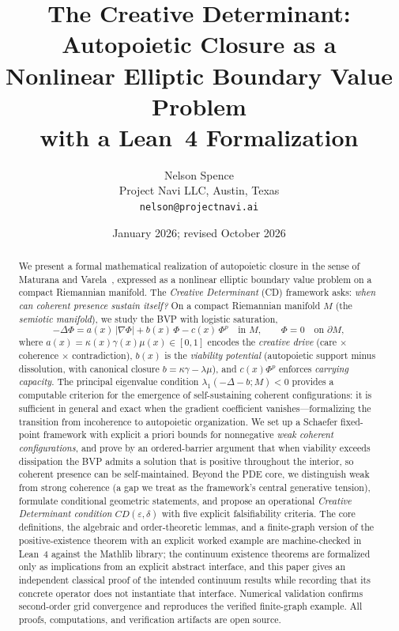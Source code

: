 \documentclass[11pt]{article}
\title{The Creative Determinant: Autopoietic Closure as a\\
Nonlinear Elliptic Boundary Value Problem\\
with a Lean~4 Formalization}
\author{Nelson Spence\\
Project Navi LLC, Austin, Texas\\
\texttt{nelson@projectnavi.ai}}
\date{January 2026; revised October 2026}
\theoremstyle{plain}
\theoremstyle{definition}
\theoremstyle{remark}
\newcommand{\abs}[1]{\left\lvert #1\right\rvert}
\begin{document}
\maketitle

\begin{abstract}
We present a formal mathematical realization of autopoietic closure in the sense of Maturana and Varela~\cite{MaturanaVarela1980}, expressed as a nonlinear elliptic boundary value problem on a compact Riemannian manifold.
The \emph{Creative Determinant} (CD) framework asks: \emph{when can coherent presence sustain itself?}
On a compact Riemannian manifold \(M\) (the \emph{semiotic manifold}), we study the BVP with logistic saturation,
\[
-\Delta \Phi = a(x)\,\abs{\nabla \Phi} + b(x)\,\Phi - c(x)\,\Phi^p\quad\text{in }M,\qquad \Phi=0\quad\text{on }\partial M,
\]
where \(a(x)=\kappa(x)\gamma(x)\mu(x)\in[0,1]\) encodes the \emph{creative drive} (care \(\times\) coherence \(\times\) contradiction), \(b(x)\) is the \emph{viability potential} (autopoietic support minus dissolution, with canonical closure \(b=\kappa\gamma - \lambda\mu\)), and \(c(x)\Phi^p\) enforces \emph{carrying capacity}.
The principal eigenvalue condition \(\lambda_1(-\Delta - b; M) < 0\) provides a computable criterion for the emergence of self-sustaining coherent configurations: it is sufficient in general and exact when the gradient coefficient vanishes---formalizing the transition from incoherence to autopoietic organization.
We set up a Schaefer fixed-point framework with explicit a priori bounds for nonnegative \emph{weak coherent configurations}, and prove by an ordered-barrier argument that when viability exceeds dissipation the BVP admits a solution that is positive throughout the interior, so coherent presence can be self-maintained.
Beyond the PDE core, we distinguish weak from strong coherence (a gap we treat as the framework's central generative tension), formulate conditional geometric statements, and propose an operational \emph{Creative Determinant condition} \(CD(\varepsilon,\delta)\) with five explicit falsifiability criteria.
The core definitions, the algebraic and order-theoretic lemmas, and a finite-graph version of the positive-existence theorem with an explicit worked example are machine-checked in Lean~4 against the Mathlib library; the continuum existence theorems are formalized only as implications from an explicit abstract interface, and this paper gives an independent classical proof of the intended continuum results while recording that its concrete operator does not instantiate that interface. Numerical validation confirms second-order grid convergence and reproduces the verified finite-graph example. All proofs, computations, and verification artifacts are open source.
\end{abstract}
\end{document}
